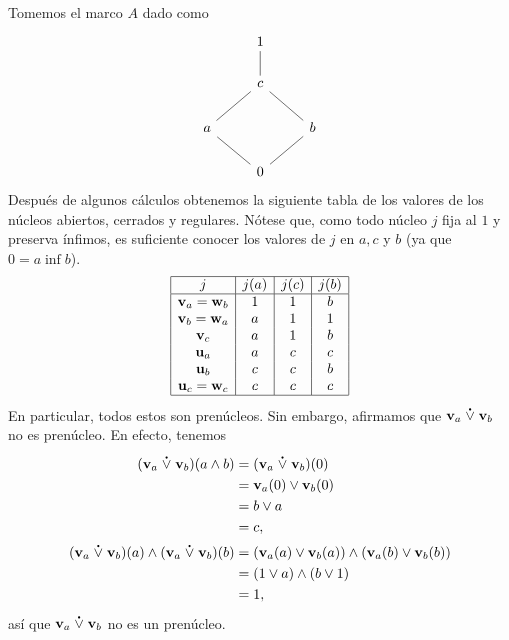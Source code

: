 \begin{exa}
  Tomemos el marco $A$ dado como
  \[
    \begin{tikzcd}
      & 1 \\
      & c \ar[u,no head] \\
      a \ar[ur,no head] & & b \ar[ul,no head] \\
      & 0 \ar[ur, no head] \ar[ul, no head]
    \end{tikzcd}
  \]
  Después de algunos cálculos obtenemos la siguiente tabla de
  los valores de los núcleos abiertos, cerrados y regulares.
  Nótese que, como todo núcleo $j$ fija al $1$ y preserva ínfimos,
  es suficiente conocer los valores de $j$ en $a,c$ y $b$
  (ya que $0=a\inf b$).
    \[ 
        \begin{array}{|c|c|c|c|}
            \hline
            j & j(a) & j(c) & j(b) \\
            \hline
            \mathbf v_{a} = \mathbf w_{b} & 1 & 1 & b \\
            \mathbf v_{b} = \mathbf w_{a} & a & 1 & 1 \\
            \mathbf v_{c} & a & 1 & b \\
            \mathbf u_{a} & a & c & c \\
            \mathbf u_{b} & c & c & b \\
            \mathbf u_{c} = \mathbf w_{c} & c & c & c \\
            \hline
        \end{array}
    \]
    En particular, todos estos son prenúcleos.
    Sin embargo, afirmamos que $\vnuc a \psup \vnuc b$ no es prenúcleo.
    En efecto, tenemos
    \begin{align*}
        (\vnuc a \psup \vnuc b)(a\inf b)
        &= (\vnuc a \psup \vnuc b)(0) \\
        &= \vnuc a(0) \sup \vnuc b(0) \\
        &= b \sup a \\
        &= c,
        \\
        (\vnuc a \psup \vnuc b)(a)
        \inf (\vnuc a \psup \vnuc b)(b)
        &= (\vnuc a(a)\sup\vnuc b(a))
            \inf
            (\vnuc a(b)\sup\vnuc b(b)) \\
        &= (1\sup a)\inf(b\sup 1) \\
        &= 1,
    \end{align*}
    así que $\vnuc a\psup\vnuc b$ no es un prenúcleo.
\end{exa}


